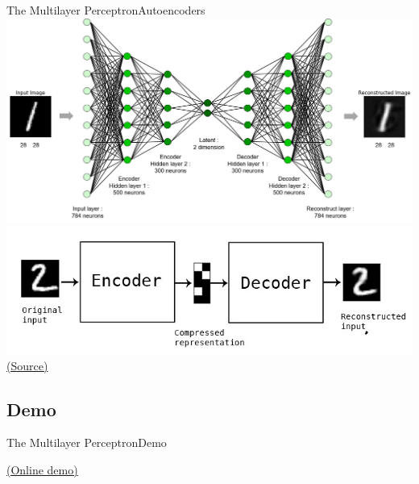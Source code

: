 \documentclass[10pt,compress]{beamer} %
\begin{document}
\begin{frame}{The Multilayer Perceptron}{Autoencoders}
	\centering\includegraphics[width=0.75\linewidth]{figs/autoencoder.png}\\\smallskip
	\centering\includegraphics[width=0.3\linewidth]{figs/autoencoder2.png}\\
	\scriptsize\href{http://i-systems.github.io/HSE545/machine\%20learning\%20all/KIMM/06\_KIMM\_Autoencoder.html}{(Source)}
\end{frame}

\subsection{Demo}
\begin{frame}{The Multilayer Perceptron}{Demo}
    \begin{center}
	\href{http://playground.tensorflow.org/}{(Online demo)}
    \end{center}
\end{frame}

\end{document}
